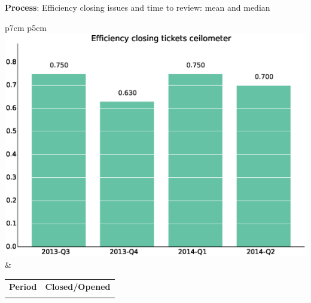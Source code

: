 \documentclass[a4wide,11pt]{report}
\begin{document}
\textbf{Process}: Efficiency closing issues and time to review: mean and median

\begin{tabular}{p{7cm} p{5cm}}
    \vspace{0pt} 
    \includegraphics[scale=.35]{figs/bmiceilometer.eps}
    & 
    \vspace{0pt}
    \begin{tabular}{l|l}%
    \bfseries Period & \bfseries Closed/Opened %
    \csvreader[head to column names]{data/bmiceilometer.csv}{}%
    {\\ & \bmi}
    \end{tabular}
\end{tabular}
\end{document}
